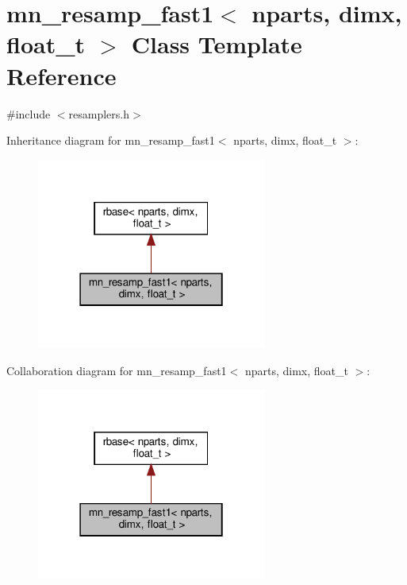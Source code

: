 \hypertarget{classmn__resamp__fast1}{}\section{mn\+\_\+resamp\+\_\+fast1$<$ nparts, dimx, float\+\_\+t $>$ Class Template Reference}
\label{classmn__resamp__fast1}


{\ttfamily \#include $<$resamplers.\+h$>$}



Inheritance diagram for mn\+\_\+resamp\+\_\+fast1$<$ nparts, dimx, float\+\_\+t $>$\+:
\nopagebreak
\begin{figure}[H]
\begin{center}
\leavevmode
\includegraphics[width=214pt]{classmn__resamp__fast1__inherit__graph}
\end{center}
\end{figure}


Collaboration diagram for mn\+\_\+resamp\+\_\+fast1$<$ nparts, dimx, float\+\_\+t $>$\+:
\nopagebreak
\begin{figure}[H]
\begin{center}
\leavevmode
\includegraphics[width=214pt]{classmn__resamp__fast1__coll__graph}
\end{center}
\end{figure}
